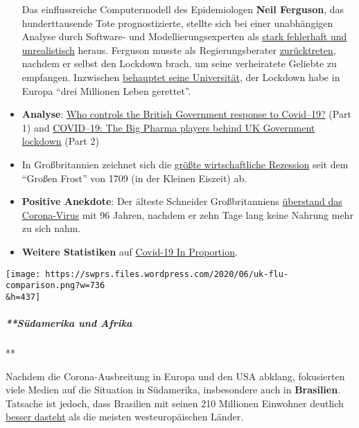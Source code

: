 \begin{itemize}
  Das einflussreiche Computermodell des Epidemiologen \textbf{Neil
  Ferguson}, das hunderttausende Tote prognostizierte, stellte sich bei
  einer unabhängigen Analyse durch Software- und Modellierungsexperten
  als
  \href{https://www.telegraph.co.uk/technology/2020/05/16/neil-fergusons-imperial-model-could-devastating-software-mistake/}{stark
  fehlerhaft und unrealistisch} heraus. Ferguson musste als
  Regierungsberater
  \href{https://www.telegraph.co.uk/news/2020/05/05/exclusive-government-scientist-neil-ferguson-resigns-breaking/}{zurücktreten},
  nachdem er selbst den Lockdown brach, um seine verheiratete Geliebte
  zu empfangen. Inzwischen
  \href{https://www.bbc.co.uk/news/health-52968523}{behauptet seine
  Universität}, der Lockdown habe in Europa ``drei Millionen Leben
  gerettet''.
\item
  \textbf{Analyse}:
  \href{https://www.ukcolumn.org/article/who-controls-british-government-response-covid19-part-one}{Who
  controls the British Government response to Covid--19?} (Part 1) and
  \href{https://www.ukcolumn.org/article/covid\%E2\%80\%9319-big-pharma-players-behind-uk-government-lockdown}{COVID--19:
  The Big Pharma players behind UK Government lockdown} (Part 2)
\item
  In Großbritannien zeichnet sich die
  \href{https://twitter.com/FinancialTimes/status/1258499372251328515}{größte
  wirtschaftliche Rezession} seit dem ``Großen Frost'' von 1709 (in der
  Kleinen Eiszeit) ab.
\item
  \textbf{Positive Anekdote}: Der älteste Schneider Großbritanniens
  \href{https://www.yorkpress.co.uk/news/18449261.oldest-working-tailor-uk-elwyn-96-beats-coronavirus/}{überstand
  das Corona-Virus} mit 96 Jahren, nachdem er zehn Tage lang keine
  Nahrung mehr zu sich nahm.
\item
  \textbf{Weitere Statistiken} auf
  \href{http://inproportion2.talkigy.com/}{Covid-19 In Proportion}.
\end{itemize}

\texttt{[image: https://swprs.files.wordpress.com/2020/06/uk-flu-comparison.png?w=736\\\&h=437]}

\hypertarget{suxfcdamerika-und-afrika}{%
\subparagraph{**Südamerika und Afrika}\label{suxfcdamerika-und-afrika}}

**

Nachdem die Corona-Ausbreitung in Europa und den USA abklang,
fokusierten viele Medien auf die Situation in Südamerika, insbesondere
auch in \textbf{Brasilien}. Tatsache ist jedoch, dass Brasilien mit
seinen 210 Millionen Einwohner deutlich
\href{https://www.statista.com/statistics/1104709/coronavirus-deaths-worldwide-per-million-inhabitants/}{besser
dasteht} als die meisten westeuropäischen Länder.

